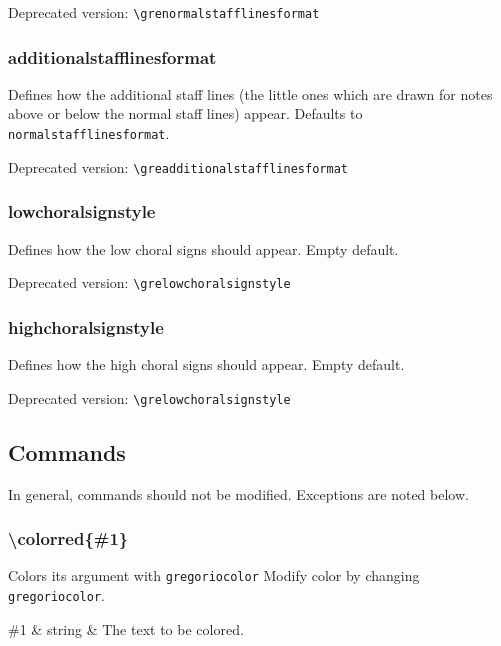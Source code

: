 \smallskip\hskip 15pt Deprecated version: \verb=\grenormalstafflinesformat=

\subsubsection*{additionalstafflinesformat}
Defines how the additional staff lines (the little ones which are
drawn for notes above or below the normal staff lines) appear.
Defaults to \verb=normalstafflinesformat=.

\smallskip\hskip 15pt Deprecated version: \verb=\greadditionalstafflinesformat=

\subsubsection*{lowchoralsignstyle}
Defines how the low choral signs should appear.  Empty default.

\smallskip\hskip 15pt Deprecated version: \verb=\grelowchoralsignstyle=

\subsubsection*{highchoralsignstyle}
Defines how the high choral signs should appear.  Empty default.

\smallskip\hskip 15pt Deprecated version: \verb=\grelowchoralsignstyle=

\subsection{Commands}

In general, commands should not be modified.  Exceptions are noted below.

\subsubsection*{\textbackslash colorred\{\#1\}}
Colors its argument with \verb=gregoriocolor= Modify color by changing
\verb=gregoriocolor=.

\begin{argtable}
  \#1 & string & The text to be colored. \\
\end{argtable}

